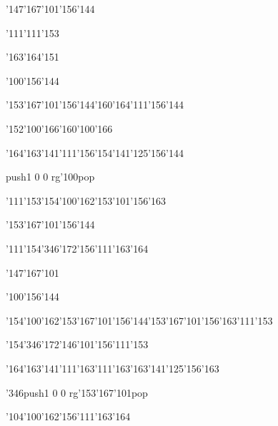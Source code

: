 \null\vfill\ipa\centerline{\enskip\enskip\enskip\enskip\enskip\enskip\enskip\enskip\char'147\char'167\char'101\char'156\char'144}\medskip\centerline{\enskip\char'111\enskip\enskip\enskip\enskip\enskip\enskip\enskip\enskip\enskip\enskip\char'111\char'153}\medskip\centerline{\enskip\enskip\enskip\char'163\char'164\char'151\enskip\enskip\enskip\enskip\enskip\enskip}\medskip\centerline{\enskip\enskip\enskip\enskip\char'100\char'156\char'144\enskip\enskip\enskip\enskip\enskip\enskip\enskip}\medskip\centerline{\enskip\enskip\enskip\enskip\enskip\char'153\char'167\char'101\char'156\char'144\enskip\char'160\char'164\char'111\char'156\char'144\enskip\enskip\enskip}\medskip\centerline{\enskip\enskip\enskip\char'152\char'100\char'166\enskip\char'160\char'100\char'166\enskip\enskip\enskip\enskip\enskip\enskip\enskip}\medskip\centerline{\enskip\char'164\char'163\char'141\char'111\char'156\enskip\enskip\enskip\enskip\char'154\char'141\char'125\char'156\char'144\enskip\enskip\enskip}\medskip\centerline{\enskip\pdfcolorstack\match push{1 0 0 rg}\char'100\pdfcolorstack\match pop{}\enskip\enskip\enskip\enskip\enskip\enskip\enskip\enskip\enskip\enskip}\medskip\centerline{\enskip\char'111\char'153\enskip\enskip\enskip\enskip\char'154\char'100\char'162\enskip\char'153\char'101\char'156\char'163}\medskip\vfill\footline{\hfil\tt\folio\hfil}\eject
\null\vfill\ipa\centerline{\enskip\enskip\enskip\enskip\enskip\enskip\enskip\enskip\char'153\char'167\char'101\char'156\char'144}\medskip\centerline{\enskip\char'111\enskip\char'154\char'346\char'172\enskip\char'156\char'111\char'163\char'164\enskip\enskip\enskip}\medskip\centerline{\enskip\enskip\enskip\char'147\char'167\char'101\enskip\enskip\enskip\enskip\enskip\enskip}\medskip\centerline{\enskip\enskip\enskip\enskip\char'100\char'156\char'144\enskip\enskip\enskip\enskip\enskip\enskip\enskip}\medskip\centerline{\enskip\char'154\char'100\char'162\enskip\char'153\char'167\char'101\char'156\char'144\enskip\char'153\char'167\char'101\char'156\char'163\enskip\char'111\char'153}\medskip\centerline{\enskip\enskip\enskip\char'154\char'346\char'172\enskip\enskip\enskip\enskip\enskip\char'146\char'101\char'156\enskip\char'111\char'153}\medskip\centerline{\enskip\char'164\char'163\char'141\char'111\char'163\enskip\char'111\char'163\enskip\char'163\char'141\char'125\char'156\char'163\enskip\enskip\enskip}\medskip\centerline{\enskip\char'346\enskip\pdfcolorstack\match push{1 0 0 rg}\char'153\char'167\char'101\pdfcolorstack\match pop{}\enskip\enskip\enskip\enskip\enskip\enskip}\medskip\centerline{\enskip\enskip\enskip\enskip\enskip\enskip\enskip\char'104\char'100\char'162\enskip\char'156\char'111\char'163\char'164}\medskip\vfill\footline{\hfil\tt\folio\hfil}\eject
